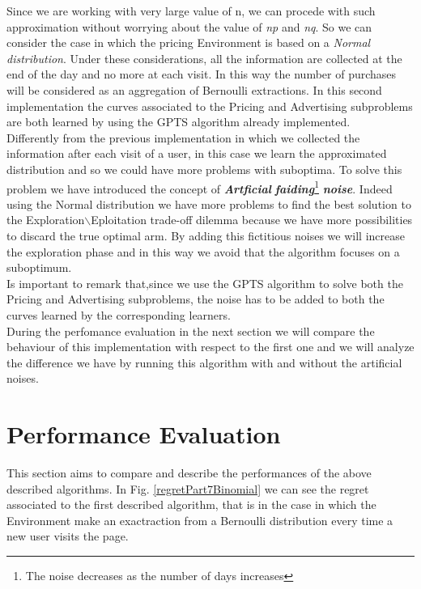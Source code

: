 Since we are working with very large value of n, we can procede with such approximation without worrying about the value of \textit{np} and \textit{nq}.
So we can consider the case in which the pricing Environment is based on a \textit{Normal distribution}. Under these considerations, all the information are collected at the end of the day and no more at each visit. In this way the number of purchases will be considered as an aggregation of Bernoulli extractions.
In this second implementation the curves associated to the Pricing and Advertising subproblems are both learned by using the GPTS algorithm already implemented.\\
Differently from the previous implementation in which we collected the information after each visit of a user, in this case we learn the approximated distribution and so we could have more problems with suboptima. To solve this problem we have introduced the concept of \textbf{\textit{Artficial}} \textbf{\textit{faiding}}\footnote{The noise decreases as the number of days increases} \textbf{\textit{noise}}. Indeed using the Normal distribution we have more problems to find the best solution to the Exploration$\backslash$Eploitation trade-off dilemma because we have more possibilities to discard the true optimal arm. By adding this fictitious noises we will increase the exploration phase and in this way we avoid that the algorithm focuses on a suboptimum.\\ Is important to remark that,since we use the GPTS algorithm to solve both the Pricing and Advertising subproblems, the noise has to be added to both the curves learned by the corresponding learners.\\ During the perfomance evaluation in the next section we will compare the behaviour of this implementation with respect to the first one and we will analyze the difference we have by running this algorithm with and without the artificial noises.

\section{Performance Evaluation}
This section aims to compare and describe the performances of the above described algorithms. In Fig. \ref{regretPart7Binomial} we can see the regret associated to the first described algorithm, that is in the case in which the Environment make an exactraction from a Bernoulli distribution every time a new user visits the page. 

